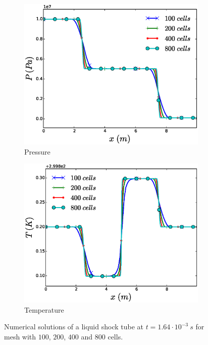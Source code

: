 \documentclass{inputs/mc2015}
\begin{document}
\begin{figure}[H]
        \begin{subfigure}[b]{0.495\textwidth}
                \centering
                \includegraphics[width=\textwidth]{figures/liquid-mesh-sensitivity-pressure-plot.eps}
                \caption{Pressure}
                \label{fig:liquid-tube-plots-press}
        \end{subfigure}        
        \begin{subfigure}[b]{0.495\textwidth}
                \centering
                \includegraphics[width=\textwidth]{figures/liquid-mesh-sensitivity-temperature-plot.eps}
                \caption{Temperature}
                \label{fig:liquid-tube-plots-temp}
        \end{subfigure}
        \caption{Numerical solutions of a liquid shock tube at $t=1.64 \cdot 10^{-3} \ s$ for mesh with $100$, $200$, $400$ and $800$ cells.}\label{fig:liquid-tube-plots}
\end{figure}
\end{document}

